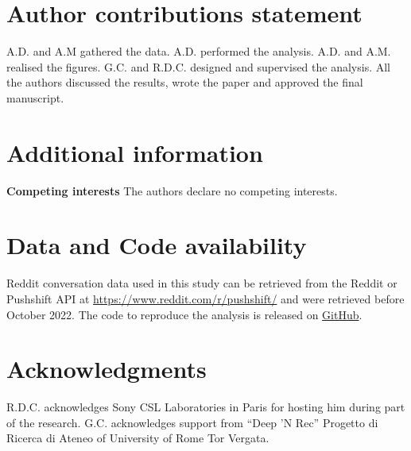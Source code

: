 \documentclass[fleqn,10pt]{wlscirep}
\begin{document}
%
%

%

\section*{Author contributions statement}
%
A.D. and A.M gathered the data.
A.D. performed the analysis.
A.D. and A.M. realised the figures.
G.C. and R.D.C. designed and supervised the analysis.
All the authors discussed the results, wrote the paper and approved the final manuscript.
%

\section*{Additional information}
\textbf{Competing interests} The authors declare no competing interests. 

%
\section*{Data and Code availability}
%
Reddit conversation data used in this study can be retrieved from the Reddit or Pushshift API at \url{https://www.reddit.com/r/pushshift/} and were retrieved before October 2022.
The code to reproduce the analysis is released on \href{https://github.com/ComplexConnectionsLab/Recurrent_Patterns_Reddit/}{GitHub}.
%
\section*{Acknowledgments}
%
R.D.C. acknowledges Sony CSL Laboratories in Paris for hosting him during part of the research.
%
G.C. acknowledges support from “Deep ’N Rec” Progetto di Ricerca di Ateneo of University of Rome Tor Vergata. 
%

\pagebreak[2]
\clearpage
\renewcommand{\figurename}{Supplementary Figure}
\renewcommand{\tablename}{Supplementary Table}
\setcounter{figure}{0}
\renewcommand{\thefigure}{S\arabic{figure}}
\renewcommand\thesection{Supplementary Materials, Section~\arabic{section}}
\end{document}
